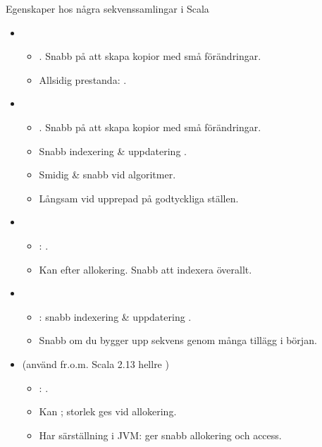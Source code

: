 \begin{Slide}{Egenskaper hos några sekvenssamlingar i Scala}
\vspace{-0.5em}
\begin{itemize}\SlideFontSmall

\item {}
  \begin{itemize}\SlideFontSmall
  \item {}. Snabb på att skapa kopior med små förändringar.
  \item Allsidig prestanda: .
  \end{itemize}

\item {}
  \begin{itemize}\SlideFontSmall
  \item {}. Snabb på att skapa kopior med små förändringar.
  \item Snabb indexering \& uppdatering .
  \item Smidig \& snabb vid  algoritmer.
  \item Långsam vid upprepad  på godtyckliga ställen.
  \end{itemize}

\item {}
  \begin{itemize}\SlideFontSmall
  \item {}: .
  \item Kan  efter allokering. Snabb att indexera överallt.
  \end{itemize}

\item {}
  \begin{itemize}\SlideFontSmall
  \item {}: snabb indexering \& uppdatering .
  \item Snabb om du bygger upp sekvens genom många tillägg i början.
  \end{itemize}

\item {} (använd fr.o.m. Scala 2.13 hellre )
  \begin{itemize}\SlideFontSmall
  \item {}: .
  \item Kan ; storlek ges vid allokering.
  \item Har särställning i JVM: ger snabb allokering och access.
  \end{itemize}

\end{itemize}
\end{Slide}

